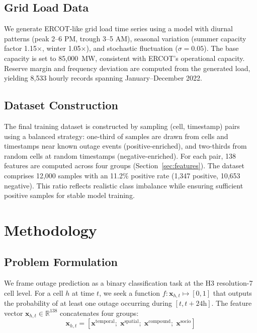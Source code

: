 \documentclass[conference]{IEEEtran}
\begin{document}
\subsection{Grid Load Data}

We generate ERCOT-like grid load time series using a model with diurnal patterns (peak 2--6 PM, trough 3--5 AM), seasonal variation (summer capacity factor 1.15$\times$, winter 1.05$\times$), and stochastic fluctuation ($\sigma = 0.05$). The base capacity is set to 85{,}000~MW, consistent with ERCOT's operational capacity. Reserve margin and frequency deviation are computed from the generated load, yielding 8{,}533 hourly records spanning January--December 2022.

\subsection{Dataset Construction}

The final training dataset is constructed by sampling (cell, timestamp) pairs using a balanced strategy: one-third of samples are drawn from cells and timestamps near known outage events (positive-enriched), and two-thirds from random cells at random timestamps (negative-enriched). For each pair, 138 features are computed across four groups (Section~\ref{sec:features}). The dataset comprises 12{,}000 samples with an 11.2\% positive rate (1{,}347 positive, 10{,}653 negative). This ratio reflects realistic class imbalance while ensuring sufficient positive samples for stable model training.

\section{Methodology}\label{sec:methodology}

\subsection{Problem Formulation}

We frame outage prediction as a binary classification task at the H3 resolution-7 cell level. For a cell $h$ at time $t$, we seek a function $f: \mathbf{x}_{h,t} \mapsto [0,1]$ that outputs the probability of at least one outage occurring during $[t, t + 24\text{h}]$. The feature vector $\mathbf{x}_{h,t} \in \mathbb{R}^{138}$ concatenates four groups:
\begin{equation}\label{eq:features}
    \mathbf{x}_{h,t} = [\mathbf{x}^{\text{temporal}};\; \mathbf{x}^{\text{spatial}};\; \mathbf{x}^{\text{compound}};\; \mathbf{x}^{\text{socio}}]
\end{equation}
\end{document}
